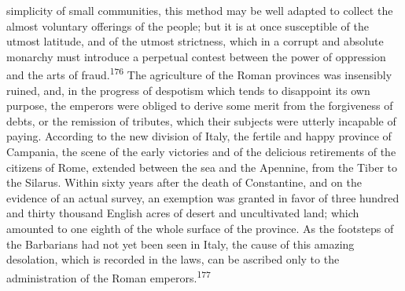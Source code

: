 simplicity of small communities, this method may be well adapted
to collect the almost voluntary offerings of the people; but it
is at once susceptible of the utmost latitude, and of the utmost
strictness, which in a corrupt and absolute monarchy must
introduce a perpetual contest between the power of oppression and
the arts of fraud.\textsuperscript{176} The agriculture of the Roman provinces was
insensibly ruined, and, in the progress of despotism which tends
to disappoint its own purpose, the emperors were obliged to
derive some merit from the forgiveness of debts, or the remission
of tributes, which their subjects were utterly incapable of
paying. According to the new division of Italy, the fertile and
happy province of Campania, the scene of the early victories and
of the delicious retirements of the citizens of Rome, extended
between the sea and the Apennine, from the Tiber to the Silarus.
Within sixty years after the death of Constantine, and on the
evidence of an actual survey, an exemption was granted in favor
of three hundred and thirty thousand English acres of desert and
uncultivated land; which amounted to one eighth of the whole
surface of the province. As the footsteps of the Barbarians had
not yet been seen in Italy, the cause of this amazing desolation,
which is recorded in the laws, can be ascribed only to the
administration of the Roman emperors.\textsuperscript{177}



